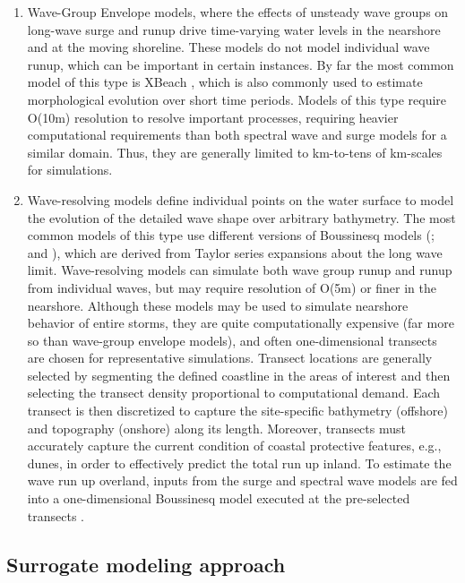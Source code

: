 \begin{enumerate}
    \item Wave-Group Envelope models, where the effects of unsteady wave groups on long-wave surge and runup drive time-varying water levels in the nearshore and at the moving shoreline. These models do not model individual wave runup, which can be important in certain instances. By far the most common model of this type is XBeach \citep{roelvink2009modelling}, which is also commonly used to estimate morphological evolution over short time periods. Models of this type require O(10m) resolution to resolve important processes, requiring heavier computational requirements than both spectral wave and surge models for a similar domain. Thus, they are generally limited to km-to-tens of km-scales for simulations. 
    \item Wave-resolving models define individual points on the water surface to model the evolution of the detailed wave shape over arbitrary bathymetry. The most common models of this type use different versions of Boussinesq models (\cite{lynett2002modeling,kennedy2000boussinesq}; and \cite{nwogu2010infragravity}), which are derived from Taylor series expansions about the long wave limit. Wave-resolving models can simulate both wave group runup and runup from individual waves, but may require resolution of O(5m) or finer in the nearshore. Although these models may be used to simulate nearshore behavior of entire storms, they are quite computationally expensive (far more so than wave-group envelope models), and often one-dimensional transects are chosen for representative simulations. Transect locations are generally selected by segmenting the defined coastline in the areas of interest and then selecting the transect density proportional to computational demand. Each transect is then discretized to capture the site-specific bathymetry (offshore) and topography (onshore) along its length. Moreover, transects must accurately capture the current condition of coastal protective features, e.g., dunes, in order to effectively predict the total run up inland. To estimate the wave run up overland, inputs from the surge and spectral wave models are fed into a one-dimensional Boussinesq model executed at the pre-selected transects  \citep{demirbilek2009wave}. 
\end{enumerate}

\subsection{Surrogate modeling approach}

